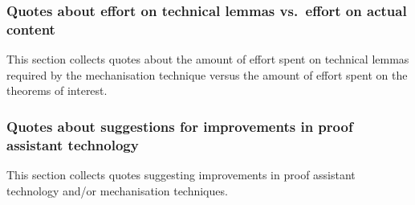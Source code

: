 \subsubsection{Quotes about effort on technical lemmas vs.\ effort on actual content}
This section collects quotes about the amount of effort spent on technical lemmas required by the mechanisation technique versus the amount of effort spent on the theorems of interest.

\subsubsection{Quotes about suggestions for improvements in proof assistant technology}
This section collects quotes suggesting improvements in proof assistant technology and/or mechanisation techniques.
